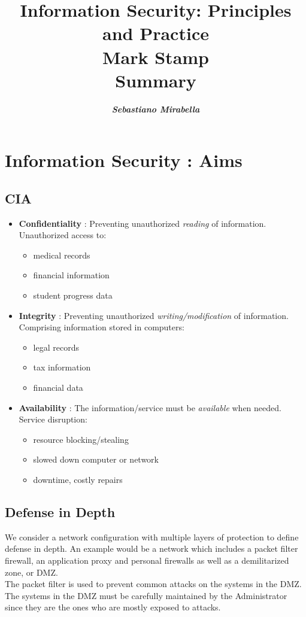 \documentclass[a4paper]{article}
\title{\textbf{Information Security: Principles and Practice\\ Mark Stamp}\\ Summary}
\author{\textbf{\textit{Sebastiano Mirabella}}}
\begin{document}
\maketitle
\tableofcontents
\newpage
{}

\section{Information Security : Aims}
\subsection{CIA}
\begin{itemize}
    \item \textbf{Confidentiality} : Preventing unauthorized \textit{reading} of information.\\
            Unauthorized access to:
            \begin{itemize}[noitemsep,nolistsep]
                \item medical records
                \item financial information
                \item student progress data
            \end{itemize}
    \item \textbf{Integrity} : Preventing unauthorized \textit{writing/modification} of information.\\
            Comprising information stored in computers:
            \begin{itemize}[noitemsep,nolistsep]
                \item legal records
                \item tax information
                \item financial data
            \end{itemize}
    \item \textbf{Availability} : The information/service must be \textit{available} when needed.\\
    Service disruption:
    \begin{itemize}[noitemsep,nolistsep]
        \item resource blocking/stealing
        \item slowed down computer or network
        \item downtime, costly repairs
    \end{itemize}
\end{itemize}
\subsection{Defense in Depth}
We consider a network configuration with multiple layers of protection to define defense in depth. An example would be a network which includes a packet filter firewall, an application proxy and personal firewalls as well as a demilitarized zone, or DMZ.\\
The packet filter is used to prevent common attacks on the systems in the DMZ. The systems in the DMZ must be carefully maintained by the Administrator since they are the ones who are mostly exposed to attacks.
\end{document}
